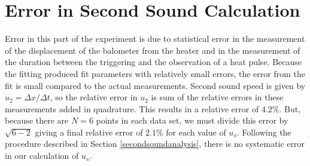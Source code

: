 
\section{Error in Second Sound Calculation}\label{errorinsecondsoundcalculation}

Error in this part of the experiment is due to statistical error in the measurement of the displacement of the balometer from the heater and in the measurement of the duration between the triggering and the observation of a heat pulse.  Because the fitting produced fit parameters with relatively small errors, the error from the fit is small compared to the actual measurements. Second sound speed is given by $u_{2}=\Delta x/ \Delta t$, so the relative error in $u_{2}$ is sum of the relative errors in these measurements added in quadrature. This results in a relative error of $4.2\%$.  But, because there are $N=6$ points in each data set, we must divide this error by $\sqrt{6-2}$ giving a final relative error of $2.1\%$ for each value of $u_{s}$.  Following the procedure described in Section \ref{secondsoundanalysis}, there is no systematic error in our calculation of $u_{s}$.
